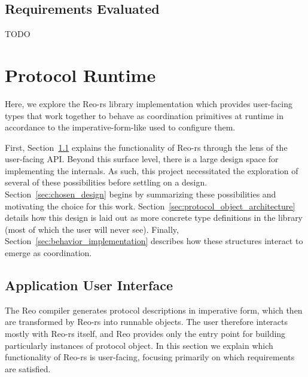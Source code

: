 \subsection{Requirements Evaluated}
TODO

\section{Protocol Runtime}
\label{sec:protocol_runtime}
Here, we explore the Reo-rs library implementation which provides user-facing types that work together to behave as coordination primitives at runtime in accordance to the imperative-form-like  used to configure them.

First, Section~\ref{sec:user_facing} explains the functionality of Reo-rs through the lens of the user-facing API. Beyond this surface level, there is a large design space for implementing the internals. As such, this project necessitated the exploration of several of these possibilities before settling on a design. Section~\ref{sec:chosen_design} begins by summarizing these possibilities and motivating the choice for this work. Section~\ref{sec:protocol_object_architecture} details how this design is laid out as more concrete type definitions in the library (most of which the user will never see). Finally, Section~\ref{sec:behavior_implementation} describes how these structures interact to emerge as coordination.

\subsection{Application User Interface}
\label{sec:user_facing}
The Reo compiler generates protocol descriptions in imperative form, which then are transformed by Reo-rs into runnable objects. The user therefore interacts mostly with Reo-rs itself, and Reo provides only the entry point for building particularly instances of protocol object. In this section we explain which functionality of Reo-rs is user-facing, focusing primarily on which requirements are satisfied.


